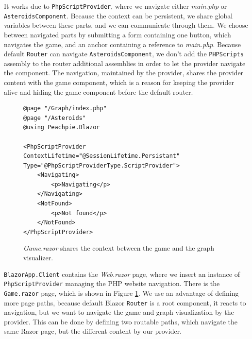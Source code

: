 It works due to \texttt{PhpScriptProvider}, where we navigate either \textit{main.php} or \texttt{AsteroidsComponent}.
Because the context can be persistent, we share global variables between these parts, and we can communicate through them.
We choose between navigated parts by submitting a form containing one button, which navigates the game, and an anchor containing a reference to \textit{main.php}.
Because default \texttt{Router} can navigate \texttt{AsteroidsComponent}, we don't add the \texttt{PHPScripts} assembly to the router additional assemblies in order to let the provider navigate the component.
The navigation, maintained by the provider, shares the provider content with the game component, which is a reason for keeping the provider alive and hiding the game component before the default router.
\par
\begin{figure}
\begin{lstlisting}
@page "/Graph/index.php"
@page "/Asteroids"
@using Peachpie.Blazor

<PhpScriptProvider ContextLifetime="@SessionLifetime.Persistant" 
Type="@PhpScriptProviderType.ScriptProvider">
    <Navigating>
        <p>Navigating</p>
    </Navigating>
    <NotFound>
        <p>Not found</p>
    </NotFound>
</PhpScriptProvider>
\end{lstlisting}
\caption{\textit{Game.razor} shares the context between the game and the graph visualizer.}
\label{img29:razor}
\end{figure}
\par
\texttt{BlazorApp.Client} contains the \textit{Web.razor} page, where we insert an instance of \texttt{PhpScriptProvider} managing the PHP website navigation.
There is the \texttt{Game.razor} page, which is shown in Figure \ref{img29:razor}.
We use an advantage of defining more page paths, because default Blazor \texttt{Router} is a root component, it reacts to navigation, but we want to navigate the game and graph visualization by the provider.
This can be done by defining two routable paths, which navigate the same Razor page, but the different content by our provider.
